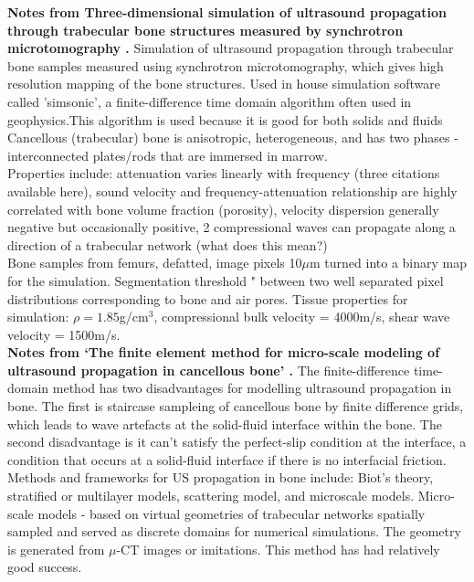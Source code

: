 \documentclass[11pt,titlepage]{article} %
\begin{document}
\textbf{Notes from Three-dimensional simulation of ultrasound propagation through trabecular bone structures measured by synchrotron microtomography \cite{bossy2005three}.}
Simulation of ultrasound propagation through trabecular bone samples measured using synchrotron microtomography, which gives high resolution mapping of the bone structures.
Used in house simulation software called 'simsonic', a finite-difference time domain algorithm often used in geophysics.This algorithm is used because it is good for both solids and fluids \cite{graves1996simulating}\\
Cancellous (trabecular) bone is anisotropic, heterogeneous, and has two phases - interconnected plates/rods that are immersed in marrow. \\
Properties include: attenuation varies linearly with frequency (three citations available here), sound velocity and frequency-attenuation relationship are highly correlated with bone volume fraction (porosity), velocity dispersion generally negative but occasionally positive, 2 compressional waves can propagate along a direction of a trabecular network (what does this mean?)\\
Bone samples from femurs, defatted, image pixels 10$\mu$m turned into a binary map for the simulation. Segmentation threshold " between two well separated pixel distributions corresponding to bone and air pores. Tissue properties for simulation: $\rho = 1.85$g/cm$^3$, compressional bulk velocity = 4000m/s, shear wave velocity = 1500m/s.\\


\textbf{Notes from `The finite element method for micro-scale modeling of ultrasound propagation in cancellous bone' \cite{vafaeian2014finite}. }
The finite-difference time-domain method has two disadvantages for modelling ultrasound propagation in bone. The first is staircase sampleing of cancellous bone by finite difference grids, which leads to wave artefacts at the solid-fluid interface within the bone. The second disadvantage is it can't satisfy the perfect-slip condition at the interface, a condition that occurs at a solid-fluid interface if there is no interfacial friction. 
Methods and frameworks for US propagation in bone include: Biot's theory, stratified or multilayer models, scattering model, and microscale models. 
Micro-scale models - based on virtual geometries of trabecular networks spatially sampled and served as discrete domains for numerical simulations. The geometry is generated from $\mu$-CT images or imitations. This method has had relatively good success. 
\end{document}
